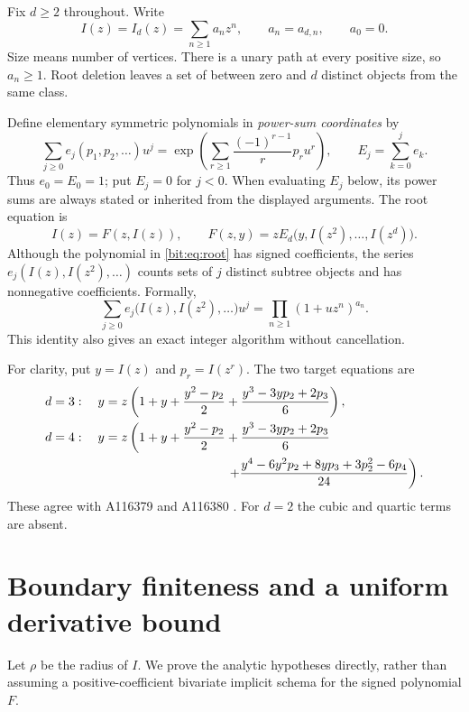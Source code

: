 \documentclass[11pt]{article}
\theoremstyle{definition}\newtheorem{definition}[theorem]{Definition}
\theoremstyle{remark}\newtheorem{remark}[theorem]{Remark}
\begin{document}
Fix $d\ge2$ throughout. Write
\begin{equation}
 I(z)=I_d(z)=\sum_{n\ge1}a_nz^n,\qquad a_n=a_{d,n},\qquad a_0=0.
 \label{bit:eq:I}
\end{equation}
Size means number of vertices. There is a unary path at every positive size, so $a_n\ge1$. Root deletion leaves a set of between zero and $d$ distinct objects from the same class.

Define elementary symmetric polynomials in \emph{power-sum coordinates} by
\begin{equation}
 \sum_{j\ge0}e_j(p_1,p_2,\ldots)u^j
 =\exp\!\left(\sum_{r\ge1}\frac{(-1)^{r-1}}r p_ru^r\right),
 \qquad E_j=\sum_{k=0}^j e_k.
 \label{bit:eq:esym}
\end{equation}
Thus $e_0=E_0=1$; put $E_j=0$ for $j<0$. When evaluating $E_j$ below, its power sums are always stated or inherited from the displayed arguments. The root equation is
\begin{equation}
 I(z)=F(z,I(z)),\qquad
 F(z,y)=zE_d\bigl(y,I(z^2),\ldots,I(z^d)\bigr).
 \label{bit:eq:root}
\end{equation}
Although the polynomial in \eqref{bit:eq:root} has signed coefficients, the series
$e_j(I(z),I(z^2),\ldots)$ counts sets of $j$ distinct subtree objects and has nonnegative coefficients. Formally,
\begin{equation}
 \sum_{j\ge0}e_j\bigl(I(z),I(z^2),\ldots\bigr)u^j
 =\prod_{n\ge1}(1+uz^n)^{a_n}.
 \label{bit:eq:product}
\end{equation}
This identity also gives an exact integer algorithm without cancellation.

For clarity, put $y=I(z)$ and $p_r=I(z^r)$. The two target equations are
\begin{align}
 d=3:\quad y&=z\left(1+y+\frac{y^2-p_2}{2}
                  +\frac{y^3-3yp_2+2p_3}{6}\right),\label{bit:eq:d3}\\
 d=4:\quad y&=z\left(1+y+\frac{y^2-p_2}{2}
                  +\frac{y^3-3yp_2+2p_3}{6}\right.\notag\\
 &\hspace{34mm}\left.+\frac{y^4-6y^2p_2+8yp_3+3p_2^2-6p_4}{24}\right).
 \label{bit:eq:d4}
\end{align}
These agree with A116379 and A116380 \cite{oeis3,oeis4}. For $d=2$ the cubic and quartic terms are absent.

\section{Boundary finiteness and a uniform derivative bound}
\label{bit:sec:closure}
Let $\rho$ be the radius of $I$. We prove the analytic hypotheses directly, rather than assuming a positive-coefficient bivariate implicit schema for the signed polynomial $F$.
\end{document}

